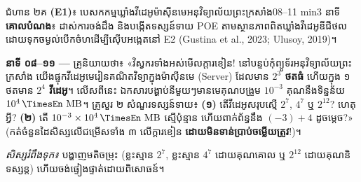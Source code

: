 \documentclass[a4paper,12pt]{article}
\newcommand{\en}[1]{{\TimesEn #1}}
\newcommand{\enbf}[1]{{\TimesEn\textbf{#1}}}
\newcommand{\unit}[1]{\,\text{\en{#1}}}
\newcommand{\scriptlead}{{\normalfont\mdseries\muol\fontsize{10.8pt}{17pt}\selectfont គ្រូនិយាយថា៖}}
\begin{document}
\Needspace{2.0cm}
\begin{phasebox}{ជំហាន ២គ \enbf{(E1)}៖ បេសកកម្មឃ្លាំងវីដេអូម៉ាស៊ីនមេអនុវិទ្យាល័យព្រះក្រសាំង}{08--11 min}{3 នាទី}
\textbf{គោលបំណង}៖ ដាស់ការចង់ដឹង និងបង្កើតទស្សន៍ទាយ \en{POE} តាមស្ថានភាពពិតឃ្លាំងវីដេអូឌីជីថល ដោយទុកចម្ងល់បើកចំហដើម្បីស៊ើបអង្កេតនៅ \en{E2} \en{(Gustina et al., 2023; Ulusoy, 2019)}។
\end{phasebox}
\begin{scriptbox}
  \textbf{នាទី ០៨--១១ —} \scriptlead{} «វិស្វករទាំងអស់មើលក្ដារខៀន! នៅបន្ទប់កុំព្យូទ័រអនុវិទ្យាល័យព្រះក្រសាំង យើងផ្ទុកវីដេអូមេរៀនគណិតវិទ្យាក្នុងម៉ាស៊ីនមេ (\en{Server}) ដែលមាន \textbf{$2^3$ ថតធំ} ហើយក្នុង ១ ថតមាន \textbf{$2^4$ វីដេអូ}។ លើសពីនេះ ឯកសារបង្ហាប់នីមួយៗមានមេគុណបង្រួម $10^{-3}$ គុណនឹងទិន្នន័យ $10^4\unit{MB}$។ គ្រូសួរ ២ សំណួរទស្សន៍ទាយ៖ \textbf{(១)} តើវីដេអូសរុបស្មើ $2^7$, $4^7$ ឬ $2^{12}$? ហេតុអ្វី? \textbf{(២)} តើ $10^{-3}\times 10^4\unit{MB}$ ស្មើប៉ុន្មាន ហើយពាក់ព័ន្ធនឹង $(-3)+4$ ដូចម្ដេច?» (កត់ចំនួនដៃសិស្សលើជម្រើសទាំង ៣ លើក្ដារខៀន \textbf{ដោយមិនទាន់ប្រាប់ចម្លើយត្រូវ}!)។\par
  \textit{សិស្សរំពឹងទុក៖} បង្ហាញមតិចម្រុះ (ខ្លះស្មាន $2^7$, ខ្លះស្មាន $4^7$ ដោយគុណគោល ឬ $2^{12}$ ដោយគុណនិទស្សន្ត) ហើយចង់ផ្ទៀងផ្ទាត់ដោយពិសោធន៍។
\end{scriptbox}
\end{document}
